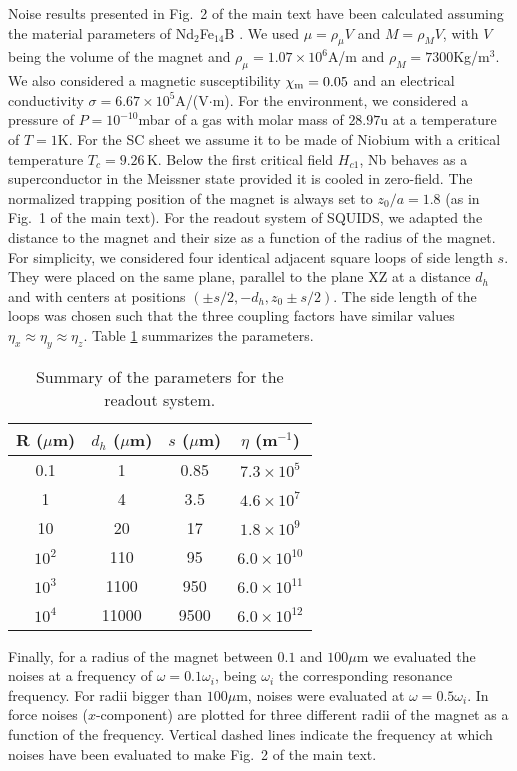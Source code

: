 \documentclass[twocolumn,superscriptaddress,floatfix,preprintnumbers,prl]{revtex4}
\begin{document}
Noise results presented in Fig.~2 of the main text have been calculated assuming the material parameters of Nd$_2$Fe$_{14}$B \cite{coey}. We used $\mu=\rho_{\mu} V$ and $M=\rho_{M} V$, with $V$ being the volume of the magnet and $\rho_{\mu}=1.07\times 10^6$A/m and $\rho_{M}=7300$Kg/m$^3$. We also considered a magnetic susceptibility $\chi_{\rm m}=0.05$ and an electrical conductivity $\sigma=6.67\times10^5$A/(V$\cdot$m). For the environment, we considered a pressure of $P=10^{-10}$mbar of a gas with molar mass of $28.97$u at a temperature of $T=1$K. For the SC sheet we assume it to be made of Niobium with a critical temperature $T_c=9.26$\,K. Below the first critical field $H_{c1}$, Nb behaves as a superconductor in the Meissner state provided it is cooled in zero-field. The normalized trapping position of the magnet is always set to $z_0/a=1.8$ (as in Fig.~1 of the main text). For the readout system of SQUIDS, we adapted the distance to the magnet and their size as a function of the radius of the magnet. For simplicity, we considered four identical adjacent square loops of side length $s$. They were placed on the same plane, parallel to the plane XZ at a distance $d_h$ and with centers at positions $(\pm s/2,-d_h,z_0\pm s/2)$. The side length of the loops was chosen such that the three coupling factors have similar values $\eta_x\approx \eta_y \approx \eta_z$. Table \ref{table} summarizes the parameters. 
%
\begin{table}[h!]
\begin{tabular}{c |c| c| c}
R ($\mu$m)              & $d_h$ ($\mu$m) & $s$ ($\mu$m) & $\eta$ (m$^{-1}$)  \\
\hline
0.1          & 1 & 0.85 & $7.3\times10^5$  \\
1            & 4 & 3.5 & $4.6\times10^7$  \\
10           & 20 & 17 & $1.8\times10^9$  \\
$10^{2}$     & 110 & 95 & $6.0\times10^{10}$  \\
$10^{3}$     & 1100 & 950 & $6.0\times10^{11}$  \\
$10^{4}$     & 11000 & 9500 & $6.0\times10^{12}$  \\
\hline
\end{tabular}
\caption{Summary of the parameters for the readout system.}
\label{table}
\end{table}
%
Finally, for a radius of the magnet between $0.1$ and $100\mu$m we evaluated the noises at a frequency of $\omega= 0.1 \omega_i$, being $\omega_i$ the corresponding resonance frequency. For radii bigger than $100\mu$m, noises were evaluated at $\omega= 0.5 \omega_i$. In  force noises ($x$-component) are plotted for three different radii of the magnet as a function of the frequency. Vertical dashed lines indicate the frequency at which noises have been evaluated to make Fig.~2 of the main text.
\end{document}
